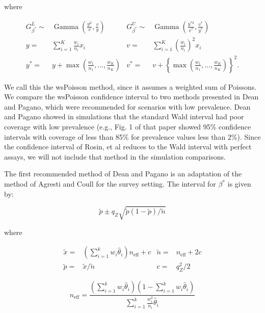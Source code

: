 \documentclass[AMA,STIX1COL]{WileyNJD-v2}
\begin{document}
where

\begin{align*}
    G_{\beta^*}^L \sim& \operatorname{Gamma}\left( \frac{y^2}{v}, \frac{v}{y} \right) &
    G_{\beta^*}^U \sim& \operatorname{Gamma}\left( \frac{y^{*2}}{v^*}, \frac{v^*}{y^*} \right) \\
    y =& \sum_{i=1}^K \frac{w_i}{n_i} x_i &
    v =& \sum_{i=1}^K \left( \frac{w_i}{n_i}\right)^2 x_i \\
    y^* =& y + \max\left(\frac{w_1}{n_1}, \ldots, \frac{w_K}{n_K} \right) &
    v^* =& v + \left\{ \max\left(\frac{w_1}{n_1}, \ldots, \frac{w_K}{n_K} \right) \right\}^2.
\end{align*}

We call this the wsPoisson method, since it assumes a weighted sum of Poissons.
We compare the wsPoisson confidence interval to two methods presented in Dean and Pagano\cite{Dean:2015}, which were recommended for scenarios with low prevalence.
Dean and Pagano showed in simulations that the standard Wald interval had poor coverage with low prevalence (e.g., Fig. 1 of that paper showed 95\% confidence intervals with coverage of less than 85\% for prevalence values less than 2\%).
Since the confidence interval of Rosin, et al \cite{rosin2021estimating} reduces to the Wald interval with perfect assays, we will not include that method in the simulation comparisons.

The first recommended method of Dean and Pagano is an adaptation of the method of Agresti and Coull\cite{AgrestiCoull} for the survey setting.
The interval for \( \beta^* \) is given by:

\begin{equation}
    \tilde{p} \pm q_Z \sqrt{\tilde{p}(1 - \tilde{p}) / \tilde{n}}
\end{equation}

where 


\begin{align*}
   \tilde{x} =& \left( \sum_{i=1}^k w_i \hat{\theta}_i \right) n_{\text{eff}} + c &
   \tilde{n} =& n_{\text{eff}} + 2c \\
    \tilde{p} =& \tilde{x} / \tilde{n} &
   c =& q_Z^2/2
\end{align*}

\begin{equation}
   n_{\text{eff}} = \frac{\left( \sum_{i=1}^k w_i \hat{\theta}_i \right) \left(1 - \sum_{i=1}^k w_i \hat{\theta}_i \right)}{\sum_{i=1}^k \frac{w_i^2}{n_i}\hat{\theta}_i} 
   \label{eq:neff}
\end{equation}
 
\end{document}
